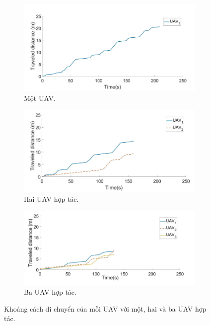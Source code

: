 \documentclass[11pt,openany]{book}
\begin{document}
\begin{figure}[H]
    \centering
    \begin{subfigure}[H]{0.7\linewidth}
        \includegraphics[width=\linewidth]{assets/3_20_a.png}
        \caption{{Một UAV.}}
        \label{fig:3.20a}
    \end{subfigure}
    \begin{subfigure}[H]{0.7\linewidth}
        \includegraphics[width=\linewidth]{assets/3_20_b.png}
        \caption{{Hai UAV hợp tác.}}
        \label{fig:3.20b}
    \end{subfigure}
    \begin{subfigure}[H]{0.7\linewidth}
        \includegraphics[width=\linewidth]{assets/3_20_c.png}
        \caption{{Ba UAV hợp tác.}}
        \label{fig:3.20c}
    \end{subfigure}
    \caption{Khoảng cách di chuyển của mỗi UAV với một, hai và ba UAV hợp tác.}
    \label{fig:3.20}
\end{figure}
\end{document}
